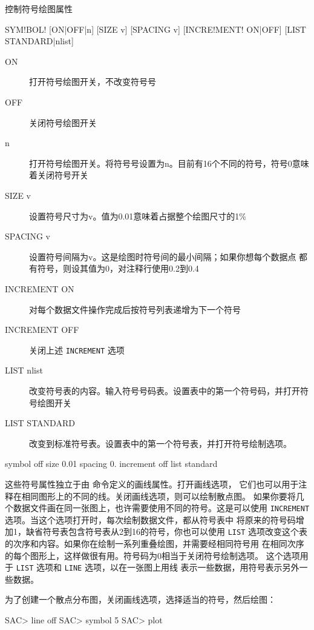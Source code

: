 \label{cmd:symbol}

控制符号绘图属性

\begin{SACSTX}
SYM!BOL! [ON|OFF|n] [SIZE v] [SPACING v] [INCRE!MENT! ON|OFF]
    [LIST STANDARD|nlist]
\end{SACSTX}

\begin{description}
\item [ON] 打开符号绘图开关，不改变符号号
\item [OFF] 关闭符号绘图开关
\item [n] 打开符号绘图开关。将符号号设置为n。目前有16个不同的符号，符号0意味着关闭符号开关
\item [SIZE v] 设置符号尺寸为v。值为0.01意味着占据整个绘图尺寸的1\%
\item [SPACING v] 设置符号间隔为v。这是绘图时符号间的最小间隔；如果你想每个数据点
    都有符号，则设其值为0，对注释行使用0.2到0.4
\item [INCREMENT ON] 对每个数据文件操作完成后按符号列表递增为下一个符号
\item [INCREMENT OFF] 关闭上述 \texttt{INCREMENT} 选项
\item [LIST nlist] 改变符号表的内容。输入符号号码表。设置表中的第一个符号码，并打开符号绘图开关
\item [LIST STANDARD] 改变到标准符号表。设置表中的第一个符号表，并打开符号绘制选项。
\end{description}

\begin{SACDFT}
symbol off size 0.01 spacing 0. increment off list standard
\end{SACDFT}

这些符号属性独立于由  命令定义的画线属性。打开画线选项，
它们也可以用于注释在相同图形上的不同的线。关闭画线选项，则可以绘制散点图。
如果你要将几个数据文件画在同一张图上，也许需要使用不同的符号。这是可以使用
\texttt{INCREMENT} 选项。当这个选项打开时，每次绘制数据文件，都从符号表中
将原来的符号码增加1，缺省符号表包含符号表从2到16的符号，你也可以使用 \texttt{LIST}
选项改变这个表的次序和内容。如果你在绘制一系列重叠绘图，并需要经相同符号用
在相同次序的每个图形上，这样做很有用。符号码为0相当于关闭符号绘制选项。
这个选项用于 \texttt{LIST} 选项和 \texttt{LINE} 选项，以在一张图上用线
表示一些数据，用符号表示另外一些数据。

为了创建一个散点分布图，关闭画线选项，选择适当的符号，然后绘图：
\begin{SACCode}
SAC> line off
SAC> symbol 5
SAC> plot
\end{SACCode}

